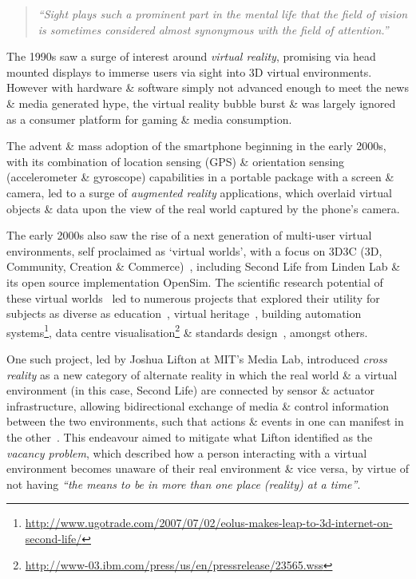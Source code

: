 \begin{quote}
	\textit{``Sight plays such a prominent part in the mental life that the field of vision is sometimes considered almost synonymous with the field of attention.''}~\cite{Lucas1951}
\end{quote}

The 1990s saw a surge of interest around \textit{virtual reality}, promising via head mounted displays to immerse users via sight into 3D virtual environments. However with hardware \& software simply not advanced enough to meet the news \& media generated hype, the virtual reality bubble burst \& was largely ignored as a consumer platform for gaming \& media consumption.

The advent \& mass adoption of the smartphone beginning in the early 2000s, with its combination of location sensing (GPS) \& orientation sensing (accelerometer \& gyroscope) capabilities in a portable package with a screen \& camera, led to a surge of \textit{augmented reality} applications, which overlaid virtual objects \& data upon the view of the real world captured by the phone's camera.

The early 2000s also saw the rise of a next generation of multi-user virtual environments, self proclaimed as `virtual worlds', with a focus on 3D3C (3D, Community, Creation \& Commerce)~\cite{Sevan2008}, including Second Life from Linden Lab \& its open source implementation OpenSim. The scientific research potential of these virtual worlds~\cite{Bainbridge2007} led to numerous projects that explored their utility for subjects as diverse as education~\cite{Allison2012}, virtual heritage~\cite{Kennedy2013}, building automation systems\footnote{\url{http://www.ugotrade.com/2007/07/02/eolus-makes-leap-to-3d-internet-on-second-life/}}, data centre visualisation\footnote{\url{http://www-03.ibm.com/press/us/en/pressrelease/23565.wss}} \& standards design~\cite{Gelissen2011a}, amongst others.

One such project, led by Joshua Lifton at MIT's Media Lab, introduced \textit{cross reality} as a new category of alternate reality in which the real world \& a virtual environment (in this case, Second Life) are connected by sensor \& actuator infrastructure, allowing bidirectional exchange of media \& control information between the two environments, such that actions \& events in one can manifest in the other~\cite{Lifton2007a}. This endeavour aimed to mitigate what Lifton identified as the \textit{vacancy problem}, which described how a person interacting with a virtual environment becomes unaware of their real environment \& vice versa, by virtue of not having \textit{``the means to be in more than one place (reality) at a time''}.

